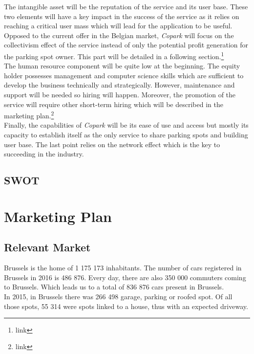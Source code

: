 \documentclass[12pt,a4paper,oneside]{book}
\newcommand{\bp}{\textit{Copark }}
\begin{document}
The intangible asset will be the reputation of the service and its user base. These two elements will have a key impact in the success of the service as it relies on reaching a critical user mass which will lead for the application to be useful. Opposed to the current offer in the Belgian market, \bp will focus on the collectivism effect of the service instead of only the potential profit generation for the parking spot owner. This part will be detailed in a following section.\footnote{link}\\

The human resource component will be quite low at the beginning. The equity holder possesses management and computer science skills which are sufficient to develop the business technically and strategically. However, maintenance and support will be needed so hiring will happen. Moreover, the promotion of the service will require other short-term hiring which will be described in the marketing plan.\footnote{link}\\

Finally, the capabilities of \bp will be its ease of use and access but mostly its capacity to establish itself as the only service to share parking spots and building user base. The last point relies on the network effect which is the key to succeeding in the industry.

\section{SWOT}

\chapter{Marketing Plan}

\section{Relevant Market}
\label{rmar}
Brussels is the home of 1 175 173\cite{ciafb} inhabitants. The number of cars registered in Brussels in 2016 is 486 876.\cite{mtvr} Every day, there are also 350 000 commuters coming to Brussels.\cite{bxcommu} Which leads us to a total of 836 876 cars present in Brussels.\\
In 2015, in Brussels there was 266 498 garage, parking or roofed spot. Of all those spots, 55 314 were spots linked to a house, thus with an expected driveway.\cite{atpb}\\
\end{document}
